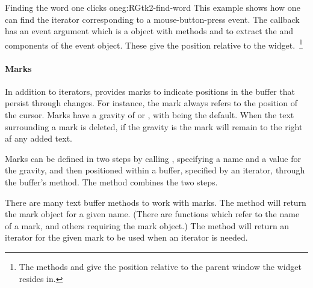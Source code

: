 \begin{example}{Finding the word one clicks on}{eg:RGtk2-find-word}
  This example shows how one can find the iterator corresponding to a
  mouse-button-press event. The callback has an event argument which is
  a  object with methods
   and  to
  extract the  and  components of the event
  object. These give the position relative to the widget.~\footnote{The methods
     and
     give the position relative to the
    parent window the widget resides in.}


\begin{Schunk}
\end{Schunk}
\end{example}


\paragraph{Marks}
In addition to iterators, \GTK\/ provides marks to indicate positions
in the buffer that persist through changes. For instance, the mark
 always refers to the position of the cursor. Marks have a
gravity of  or , with  being the
default. When the text surrounding a mark is deleted, if the gravity
is  the mark will remain to the right af any added
text. 


Marks can be defined in two steps by calling ,
specifying a name and a value for the gravity, and then 
positioned within a buffer, specified by an iterator, through the
buffer's  method. The
 method combines the two steps.

There are many text buffer methods to work with marks. The
 method will return the mark object for
a given name. (There are functions which refer to the name of a mark,
and others requiring the mark object.) The method  will return
an iterator for the given mark to be used when an iterator is needed.




